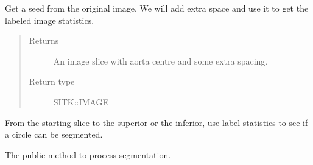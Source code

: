 \documentclass[letterpaper,10pt,english]{sphinxmanual}
\begin{document}
\begin{fulllineitems}
\begin{fulllineitems}
\end{fulllineitems}


\begin{fulllineitems}
\label{\detokenize{AortaGeomReconDisplayModuleLib:AortaSegmenter.AortaSegmenter.__prepare_seed}}
\sphinxAtStartPar
Get a seed from the original image. We will add extra space
and use it to get the labeled image statistics.
\begin{quote}\begin{description}
\item[{Returns}] \leavevmode
\sphinxAtStartPar
An image slice with aorta centre and some extra spacing.

\item[{Return type}] \leavevmode
\sphinxAtStartPar
SITK::IMAGE

\end{description}\end{quote}

\end{fulllineitems}


\begin{fulllineitems}
\label{\detokenize{AortaGeomReconDisplayModuleLib:AortaSegmenter.AortaSegmenter.__segmentation}}
\sphinxAtStartPar
From the starting slice to the superior or the inferior,
use label statistics to see if a circle can be segmented.

\end{fulllineitems}


\begin{fulllineitems}
\label{\detokenize{AortaGeomReconDisplayModuleLib:AortaSegmenter.AortaSegmenter.begin_segmentation}}
\sphinxAtStartPar
The public method to process segmentation.


\end{fulllineitems}
\end{fulllineitems}
\end{document}
